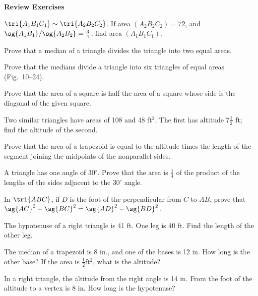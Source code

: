 \documentclass[11pt]{book}
\theoremstyle{bkplain}
\theoremstyle{XIplainnote}
\theoremstyle{bkplain}
\theoremstyle{bkplain}
\begin{document}
\par\medskip\begin{center}\bfseries Review Exercises\end{center}\par\nopagebreak
\begin{exlist}
\item $\tri{A_1B_1C_1} \sim \tri{A_2B_2C_2}$. If area $(A_2B_2C_2) = 72$, and
  $\sg{A_1B_1}/\sg{A_2B_2} = \tfrac{3}{4}$, find area $(A_1B_1C_1)$.
\item Prove that a median of a triangle divides the triangle into two equal
  areas.
\item[\stex 3.] Prove that the medians divide a triangle into six triangles of
  equal areas (Fig.~10--24).
\exfig{\FIGXTWENTYFOUR}
\item[4.] Prove that the area of a square is half the area of a square whose
  side is the diagonal of the given square.
\item[5.] Two similar triangles have areas of 108 and 48 ft$^2$. The first has
  altitude $7\frac{1}{2}$ ft; find the altitude of the second.
\item[6.] Prove that the area of a trapezoid is equal to the altitude times the
  length of the segment joining the midpoints of the nonparallel sides.
\item[7.] A triangle has one angle of $30^\circ$. Prove that the area is
  $\frac{1}{4}$ of the product of the lengths of the sides adjacent to the
  $30^\circ$ angle.
\item[8.] In $\tri{ABC}$, if $D$ is the foot of the perpendicular from $C$ to
  $AB$, prove that $\sg{AC}^2 - \sg{BC}^2 = \sg{AD}^2 - \sg{BD}^2$.
\item[9.] The hypotenuse of a right triangle is 41 ft. One leg is 40 ft. Find
  the length of the other leg.
\item[10.] The median of a trapezoid is 8 in., and one of the bases is 12 in.
  How long is the other base? If the area is $\frac{1}{2}$ft$^2$, what is the
  altitude?
\item[11.] In a right triangle, the altitude from the right angle is 14 in.
  From the foot of the altitude to a vertex is 8 in. How long is the
  hypotenuse?
\end{exlist}
\end{document}
